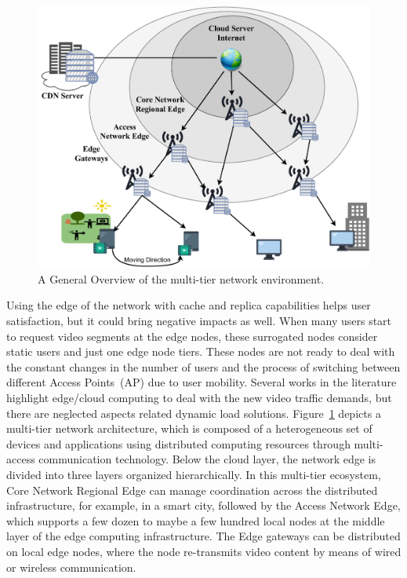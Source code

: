 \begin{figure}
    \centering
    \includegraphics[width=\linewidth]{images/arch-video-content-2.pdf}
    \caption{A General Overview of the multi-tier network environment.}
    \label{fig:multi-tier-network}
\end{figure}

Using the edge of the network with cache and replica capabilities helps user satisfaction, but it could bring negative impacts as well. When many users start to request video segments at the edge nodes, these surrogated nodes consider static users and just one edge node tiers. These nodes are not ready to deal with the constant changes in the number of users and the process of switching between different Access Points~(AP) due to user mobility.
Several works in the literature highlight edge/cloud computing to deal with the new video traffic demands, but there are neglected aspects  related dynamic load solutions. Figure~\ref{fig:multi-tier-network} depicts a multi-tier network architecture, which is composed of a heterogeneous set of devices and applications using distributed computing resources through multi-access communication technology. Below the cloud layer, the network edge is divided into three layers organized hierarchically. In this multi-tier ecosystem, Core Network Regional Edge can manage coordination across the distributed infrastructure, for example, in a smart city, followed by the Access Network Edge, which supports a few dozen to maybe a few hundred local nodes at the middle layer of the edge computing infrastructure. The Edge gateways can be distributed on local edge nodes, where the node re-transmits video content by means of wired or wireless communication.
%
%

